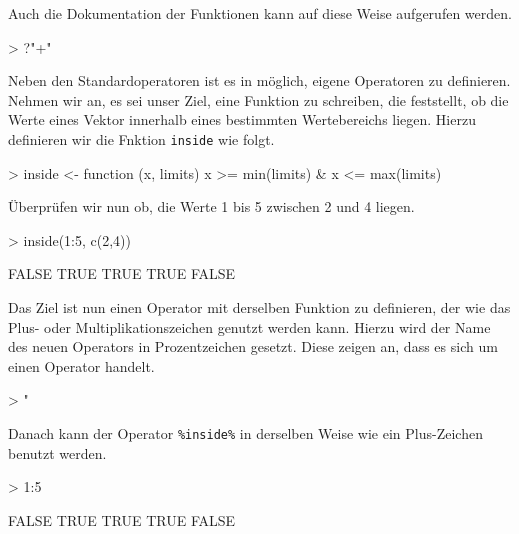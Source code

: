 \documentclass[12pt, a4paper,twoside,openany,x11names,svgnames]{memoir}
\begin{document}
Auch die Dokumentation der Funktionen kann auf diese Weise aufgerufen werden.

\begin{Schunk}
\begin{Sinput}
> ?"+"
\end{Sinput}
\end{Schunk}
    
Neben den Standardoperatoren ist es in \R{} möglich, eigene Operatoren zu definieren. Nehmen wir an, es sei unser Ziel, eine Funktion zu schreiben, die feststellt, ob die Werte eines Vektor innerhalb eines bestimmten Wertebereichs liegen. Hierzu definieren wir die Fnktion \texttt{inside} wie folgt.

\begin{Schunk}
\begin{Sinput}
> inside <- function (x, limits) {
 	x >= min(limits) & x <= max(limits)
 }
\end{Sinput}
\end{Schunk}

Überprüfen wir nun ob, die Werte 1 bis 5 zwischen 2 und 4 liegen.

\begin{Schunk}
\begin{Sinput}
> inside(1:5, c(2,4))
\end{Sinput}
\begin{Soutput}
[1] FALSE  TRUE  TRUE  TRUE FALSE
\end{Soutput}
\end{Schunk}

Das Ziel ist nun einen Operator mit derselben Funktion zu definieren, der wie das Plus- oder Multiplikationszeichen genutzt werden kann. Hierzu wird  der Name des neuen Operators in Prozentzeichen gesetzt. Diese zeigen \R{} an, dass es sich um einen Operator handelt.

\begin{Schunk}
\begin{Sinput}
> "%inside%" <- inside
\end{Sinput}
\end{Schunk}

Danach kann der Operator \texttt{\%inside\%} in derselben Weise wie ein Plus-Zeichen benutzt werden.

\begin{Schunk}
\begin{Sinput}
> 1:5 %inside% c(2,4)
\end{Sinput}
\begin{Soutput}
[1] FALSE  TRUE  TRUE  TRUE FALSE
\end{Soutput}
\end{Schunk}
\end{document}
